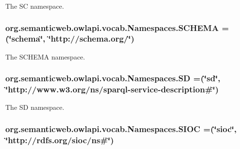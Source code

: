 The S\-C namespace. \hypertarget{enumorg_1_1semanticweb_1_1owlapi_1_1vocab_1_1_namespaces_a3a7848a1968a8f74226ad9b18bd509ea}{
\subsubsection[{S\-C\-H\-E\-M\-A}]{\setlength{\rightskip}{0pt plus 5cm}org.\-semanticweb.\-owlapi.\-vocab.\-Namespaces.\-S\-C\-H\-E\-M\-A =(\char`\"{}schema\char`\"{}, \char`\"{}http\-://schema.\-org/\char`\"{})}}\label{enumorg_1_1semanticweb_1_1owlapi_1_1vocab_1_1_namespaces_a3a7848a1968a8f74226ad9b18bd509ea}
The S\-C\-H\-E\-M\-A namespace. \hypertarget{enumorg_1_1semanticweb_1_1owlapi_1_1vocab_1_1_namespaces_a0980c237b70f6a08ad2771476d740c98}{
\subsubsection[{S\-D}]{\setlength{\rightskip}{0pt plus 5cm}org.\-semanticweb.\-owlapi.\-vocab.\-Namespaces.\-S\-D =(\char`\"{}sd\char`\"{}, \char`\"{}http\-://www.\-w3.\-org/{\bf ns}/sparql-\/service-\/description\#\char`\"{})}}\label{enumorg_1_1semanticweb_1_1owlapi_1_1vocab_1_1_namespaces_a0980c237b70f6a08ad2771476d740c98}
The S\-D namespace. \hypertarget{enumorg_1_1semanticweb_1_1owlapi_1_1vocab_1_1_namespaces_aa14297fd57aab46fef51a602b1d92abe}{
\subsubsection[{S\-I\-O\-C}]{\setlength{\rightskip}{0pt plus 5cm}org.\-semanticweb.\-owlapi.\-vocab.\-Namespaces.\-S\-I\-O\-C =(\char`\"{}sioc\char`\"{}, \char`\"{}http\-://rdfs.\-org/sioc/{\bf ns}\#\char`\"{})}}\label{enumorg_1_1semanticweb_1_1owlapi_1_1vocab_1_1_namespaces_aa14297fd57aab46fef51a602b1d92abe}
